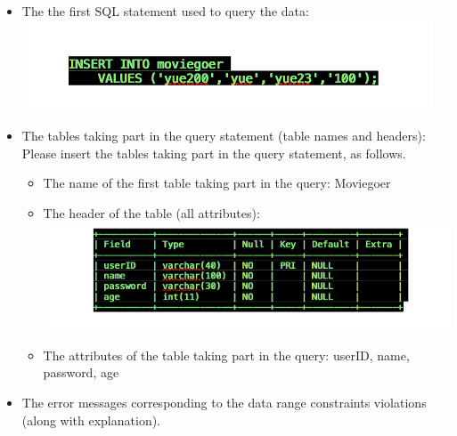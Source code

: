 {\begin{itemize}
	The error messages corresponding to the integrity constraints violations (along with explanations and examples).
	\begin{itemize} 
	\item{The error message: }
	Null was entered into a field that cannot be null
	\item{The error message explanation (upon which violation does it take place): }
	This error is for when a user tries to rate a movie without specifying a movie ID.  This violates the integrity constraint that each rating must be for exactly one movie.
	\item{The error message example according to user(s) scenario(s): }
	 A user enters a rating, but does not specify the movie that the rating is for.  Since the rating has to belong to a movie, that action is not allowed
	 \end{itemize}
\item{The the first SQL statement used to query the data: }
	\includegraphics[scale=0.3]{insertData.png}
\item{The tables taking part in the query statement (table names and headers): }
	Please insert the tables taking part in the query statement, as follows.
	 \begin{itemize} 
	 \item{The name of the first table taking part in the query: }
	 Moviegoer
	  \item{The header of the table  (all attributes): }
	\includegraphics[scale=0.3]{moviegoerdescribe.png}
	  \item{The attributes of the table taking part in the query: }
	  userID, name, password, age
	 \end{itemize}
\item{}
	The error messages corresponding to the data range constraints violations (along with explanation).
	\begin{itemize} 

\end{itemize}
\end{itemize}}

